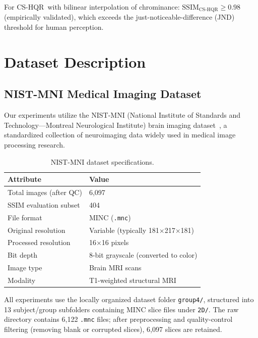 \documentclass{ipol}
\newcommand{\cshqr}{\textsc{CS-HQR}}
\begin{document}
For \cshqr\ with bilinear interpolation of chrominance:
$\text{SSIM}_{\text{CS-HQR}} \geq 0.98$ (empirically validated), which
exceeds the just-noticeable-difference (JND) threshold for human perception.

\FloatBarrier
\section{Dataset Description}
\label{sec:dataset}

\FloatBarrier
\subsection{NIST-MNI Medical Imaging Dataset}

Our experiments utilize the NIST-MNI (National Institute of Standards and
Technology---Montreal Neurological Institute) brain imaging
dataset~\cite{ref46}, a standardized collection of neuroimaging data widely
used in medical image processing research.

\begin{table}[H]
\begin{center}
\begin{tabular}{ll}
\hline
Attribute & Value \\
\hline
Total images (after QC) & 6,097 \\
SSIM evaluation subset & 404 \\
File format & MINC (\texttt{.mnc}) \\
Original resolution & Variable (typically 181$\times$217$\times$181) \\
Processed resolution & 16$\times$16 pixels \\
Bit depth & 8-bit grayscale (converted to color) \\
Image type & Brain MRI scans \\
Modality & T1-weighted structural MRI \\
\hline
\end{tabular}
\caption{NIST-MNI dataset specifications.}
\label{tab:dataset}
\end{center}
\end{table}

All experiments use the locally organized dataset folder \texttt{group4/},
structured into 13 subject/group subfolders containing MINC slice files under
\texttt{2D/}. The raw directory contains 6,122 \texttt{.mnc} files; after
preprocessing and quality-control filtering (removing blank or corrupted
slices), 6,097 slices are retained.
\end{document}
